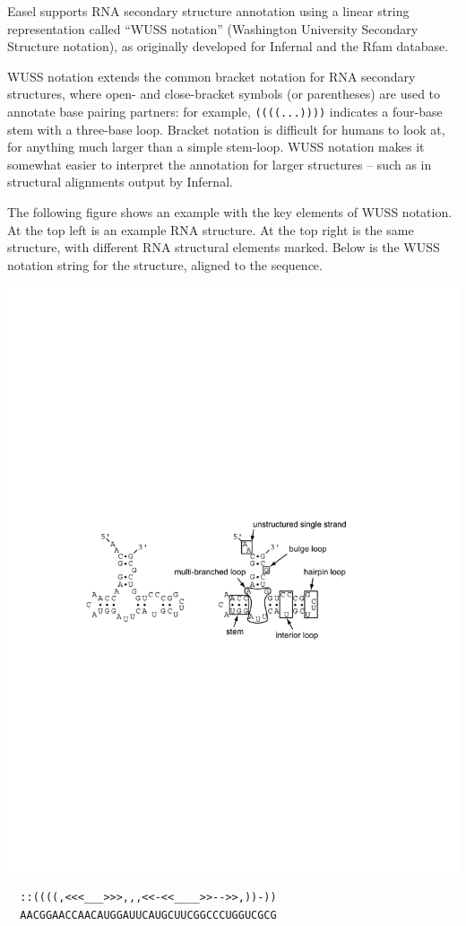 
Easel supports RNA secondary structure annotation using a linear
string representation called ``WUSS notation'' (Washington University
Secondary Structure notation), as originally developed for Infernal
and the Rfam database.

WUSS notation extends the common bracket notation for RNA secondary
structures, where open- and close-bracket symbols (or parentheses) are
used to annotate base pairing partners: for example,
\verb+((((...))))+ indicates a four-base stem with a three-base loop.
Bracket notation is difficult for humans to look at, for anything much
larger than a simple stem-loop. WUSS notation makes it somewhat easier
to interpret the annotation for larger structures -- such as in
structural alignments output by Infernal.

The following figure shows an example with the key elements of WUSS
notation.  At the top left is an example RNA structure. At the top
right is the same structure, with different RNA structural elements
marked. Below is the WUSS notation string for the structure, aligned
to the sequence.

\begin{center}
\includegraphics[scale=0.8]{figures/rna_elements}
\end{center}
\begin{center}
\begin{BVerbatim}
  ::((((,<<<___>>>,,,<<-<<____>>-->>,))-))
  AACGGAACCAACAUGGAUUCAUGCUUCGGCCCUGGUCGCG
\end{BVerbatim}
\end{center}

